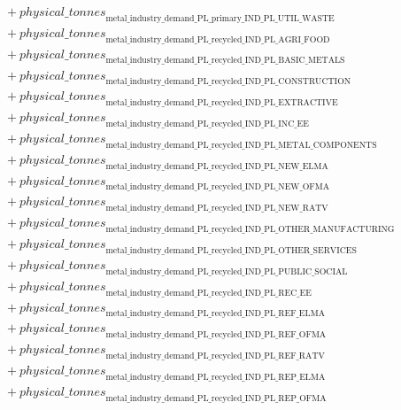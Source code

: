 \documentclass[11pt]{article}
\begin{document}
\begin{align*}
&\quad {}+ {physical\_tonnes}_{\text{metal\_industry\_demand\_PL\_primary\_IND\_PL\_UTIL\_WASTE}}\\
&\quad {}+ {physical\_tonnes}_{\text{metal\_industry\_demand\_PL\_recycled\_IND\_PL\_AGRI\_FOOD}}\\
&\quad {}+ {physical\_tonnes}_{\text{metal\_industry\_demand\_PL\_recycled\_IND\_PL\_BASIC\_METALS}}\\
&\quad {}+ {physical\_tonnes}_{\text{metal\_industry\_demand\_PL\_recycled\_IND\_PL\_CONSTRUCTION}}\\
&\quad {}+ {physical\_tonnes}_{\text{metal\_industry\_demand\_PL\_recycled\_IND\_PL\_EXTRACTIVE}}\\
&\quad {}+ {physical\_tonnes}_{\text{metal\_industry\_demand\_PL\_recycled\_IND\_PL\_INC\_EE}}\\
&\quad {}+ {physical\_tonnes}_{\text{metal\_industry\_demand\_PL\_recycled\_IND\_PL\_METAL\_COMPONENTS}}\\
&\quad {}+ {physical\_tonnes}_{\text{metal\_industry\_demand\_PL\_recycled\_IND\_PL\_NEW\_ELMA}}\\
&\quad {}+ {physical\_tonnes}_{\text{metal\_industry\_demand\_PL\_recycled\_IND\_PL\_NEW\_OFMA}}\\
&\quad {}+ {physical\_tonnes}_{\text{metal\_industry\_demand\_PL\_recycled\_IND\_PL\_NEW\_RATV}}\\
&\quad {}+ {physical\_tonnes}_{\text{metal\_industry\_demand\_PL\_recycled\_IND\_PL\_OTHER\_MANUFACTURING}}\\
&\quad {}+ {physical\_tonnes}_{\text{metal\_industry\_demand\_PL\_recycled\_IND\_PL\_OTHER\_SERVICES}}\\
&\quad {}+ {physical\_tonnes}_{\text{metal\_industry\_demand\_PL\_recycled\_IND\_PL\_PUBLIC\_SOCIAL}}\\
&\quad {}+ {physical\_tonnes}_{\text{metal\_industry\_demand\_PL\_recycled\_IND\_PL\_REC\_EE}}\\
&\quad {}+ {physical\_tonnes}_{\text{metal\_industry\_demand\_PL\_recycled\_IND\_PL\_REF\_ELMA}}\\
&\quad {}+ {physical\_tonnes}_{\text{metal\_industry\_demand\_PL\_recycled\_IND\_PL\_REF\_OFMA}}\\
&\quad {}+ {physical\_tonnes}_{\text{metal\_industry\_demand\_PL\_recycled\_IND\_PL\_REF\_RATV}}\\
&\quad {}+ {physical\_tonnes}_{\text{metal\_industry\_demand\_PL\_recycled\_IND\_PL\_REP\_ELMA}}\\
&\quad {}+ {physical\_tonnes}_{\text{metal\_industry\_demand\_PL\_recycled\_IND\_PL\_REP\_OFMA}}\\

\end{align*}
\end{document}
